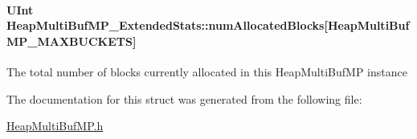 \paragraph[{numAllocatedBlocks}]{\setlength{\rightskip}{0pt plus 5cm}UInt {\bf HeapMultiBufMP\_\-ExtendedStats::numAllocatedBlocks}\mbox{[}HeapMultiBufMP\_\-MAXBUCKETS\mbox{]}}\hfill\label{struct_heap_multi_buf_m_p___extended_stats_a6e1fab6694ccbea899c34a9c11e207e4}
The total number of blocks currently allocated in this HeapMultiBufMP instance 

The documentation for this struct was generated from the following file:\begin{DoxyCompactItemize}
\item 
\hyperlink{_heap_multi_buf_m_p_8h}{HeapMultiBufMP.h}\end{DoxyCompactItemize}
